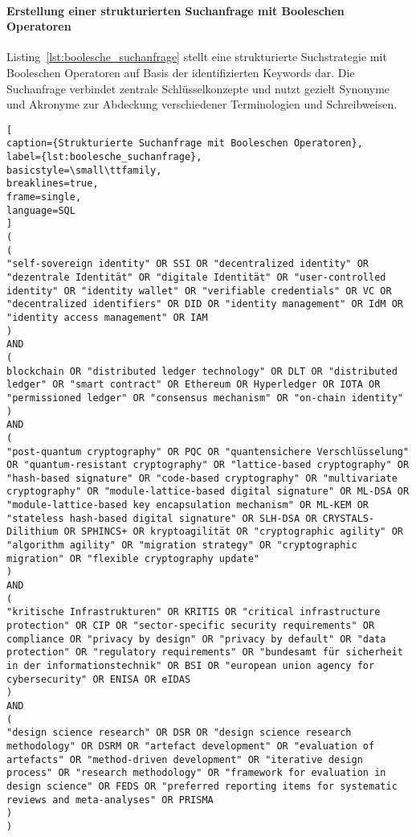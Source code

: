 \pagebreak

\paragraph*{Erstellung einer strukturierten Suchanfrage mit Booleschen Operatoren}

Listing~\ref{lst:boolesche_suchanfrage} stellt eine strukturierte Suchstrategie mit Booleschen Operatoren auf Basis der identifizierten Keywords dar. Die Suchanfrage verbindet zentrale Schlüsselkonzepte und nutzt gezielt Synonyme und Akronyme zur Abdeckung verschiedener Terminologien und Schreibweisen.
\newline

\begin{lstlisting}[
caption={Strukturierte Suchanfrage mit Booleschen Operatoren},
label={lst:boolesche_suchanfrage},
basicstyle=\small\ttfamily,
breaklines=true,
frame=single,
language=SQL
]
(
(
"self-sovereign identity" OR SSI OR "decentralized identity" OR "dezentrale Identität" OR "digitale Identität" OR "user-controlled identity" OR "identity wallet" OR "verifiable credentials" OR VC OR "decentralized identifiers" OR DID OR "identity management" OR IdM OR "identity access management" OR IAM
)
AND
(
blockchain OR "distributed ledger technology" OR DLT OR "distributed ledger" OR "smart contract" OR Ethereum OR Hyperledger OR IOTA OR "permissioned ledger" OR "consensus mechanism" OR "on-chain identity"
)
AND
(
"post-quantum cryptography" OR PQC OR "quantensichere Verschlüsselung" OR "quantum-resistant cryptography" OR "lattice-based cryptography" OR "hash-based signature" OR "code-based cryptography" OR "multivariate cryptography" OR "module-lattice-based digital signature" OR ML-DSA OR "module-lattice-based key encapsulation mechanism" OR ML-KEM OR "stateless hash-based digital signature" OR SLH-DSA OR CRYSTALS-Dilithium OR SPHINCS+ OR kryptoagilität OR "cryptographic agility" OR "algorithm agility" OR "migration strategy" OR "cryptographic migration" OR "flexible cryptography update"
)
AND
(
"kritische Infrastrukturen" OR KRITIS OR "critical infrastructure protection" OR CIP OR "sector-specific security requirements" OR compliance OR "privacy by design" OR "privacy by default" OR "data protection" OR "regulatory requirements" OR "bundesamt für sicherheit in der informationstechnik" OR BSI OR "european union agency for cybersecurity" OR ENISA OR eIDAS
)
AND
(
"design science research" OR DSR OR "design science research methodology" OR DSRM OR "artefact development" OR "evaluation of artefacts" OR "method-driven development" OR "iterative design process" OR "research methodology" OR "framework for evaluation in design science" OR FEDS OR "preferred reporting items for systematic reviews and meta-analyses" OR PRISMA
)
)
\end{lstlisting}

